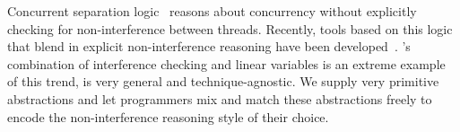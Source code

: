 Concurrent separation logic~\cite{OHearn07} reasons about concurrency without 
explicitly checking for non-interference between threads. 
Recently, tools based on this logic that blend in explicit non-interference reasoning have been developed~\cite{SAGL,RGSep}. 
\civl's combination of interference checking and linear variables is
an extreme example of this trend, is very general and technique-agnostic. 
We supply very primitive abstractions and let programmers mix and
match these abstractions freely to encode the non-interference reasoning style of their choice. 




